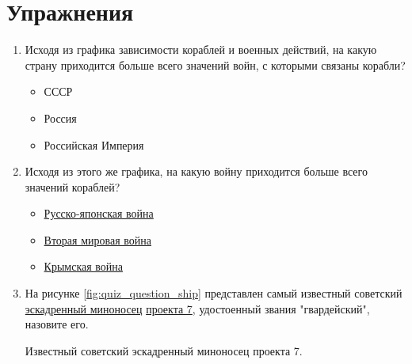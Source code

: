 \section{Упражнения}

\begin{enumerate}
  \item Исходя из графика зависимости кораблей и военных действий, на какую страну приходится больше всего значений войн, с которыми связаны корабли?
  \begin{itemize}
    \item СССР
    \item Россия
    \item Российская Империя
  \end{itemize}

  \item Исходя из этого же графика, на какую войну приходится больше всего значений кораблей?
  \begin{itemize}
    \item \href{https://www.wikidata.org/wiki/Q159950}{Русско-японская война}
    \item \href{https://www.wikidata.org/wiki/Q362}{Вторая мировая война}
    \item \href{https://www.wikidata.org/wiki/Q254106}{Крымская война}
  \end{itemize}

  \item На рисунке \ref{fig:quiz_question_ship} представлен самый известный советский \href{https://ru.wikipedia.org/wiki/Эскадренный_миноносец}{эскадренный миноносец} \href{https://ru.wikipedia.org/wiki/Эскадренные_миноносцы_проекта_7}{проекта 7}, удостоенный звания "гвардейский", назовите его.
  
  \begin{marginfigure}[0.0cm]
    {
      \setlength{\fboxsep}{0pt}%
      \setlength{\fboxrule}{1pt}%
    }
    \caption{Известный советский эскадренный миноносец проекта 7.}%
    \label{fig:quiz_question_ship}%
  \end{marginfigure}
\end{enumerate}